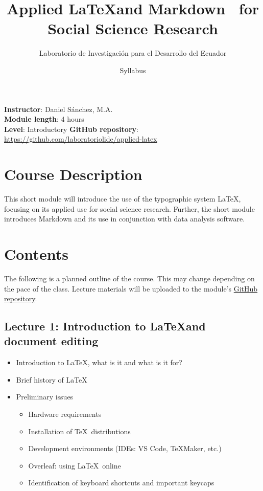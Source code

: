 \documentclass[a4paper,12pt]{article}
\title{Applied \LaTeX and Markdown \ for Social Science Research}
\author{Laboratorio de Investigación para el Desarrollo del Ecuador}
\date{Syllabus}
\begin{document}
\maketitle

\noindent \textbf{Instructor}: Daniel Sánchez, M.A. \\
\textbf{Module length}: 4 hours \\
\textbf{Level}: Introductory
\textbf{GitHub repository}: \url{https://github.com/laboratoriolide/applied-latex}

\section{Course Description}

This short module will introduce the use of the typographic system \LaTeX, focusing on its applied use for social science research. Further, the short module introduces Markdown and its use in conjunction with data analysis software. 

\section{Contents}

The following is a planned outline of the course. This may change depending on the pace of the
class. Lecture materials will be uploaded to the module's \href{https://github.com/laboratoriolide/applied-latex}{GitHub repository}.

\subsection{Lecture 1: Introduction to \LaTeX and document editing}

\begin{itemize}
    \item Introduction to \LaTeX, what is it and what is it for?
    \item Brief history of \LaTeX
    \item Preliminary issues
    \begin{itemize}
        \item Hardware requirements
        \item Installation of \TeX \ distributions
        \item Development environments (IDEs: VS Code, \TeX Maker, etc.)
        \item Overleaf: using \LaTeX \ online
        \item Identification of keyboard shortcuts and important keycaps
    \end{itemize}
\end{itemize}
\end{document}

